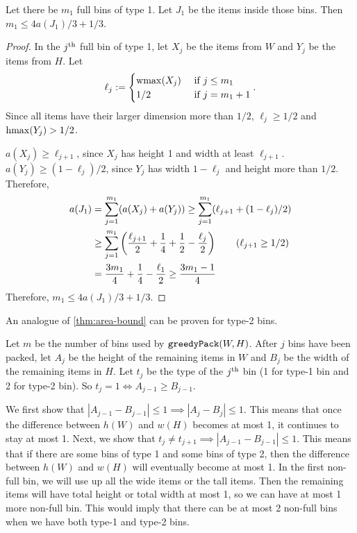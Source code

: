 \begin{lemma}
\label{thm:area-bound}
Let there be $m_1$ full bins of type 1.
Let $J_1$ be the items inside those bins.
Then $m_1 \le 4a(J_1)/3 + 1/3$.
\end{lemma}
\begin{proof}
In the $j^{\textrm{th}}$ full bin of type 1, let $X_j$ be the items from $W$
and $Y_j$ be the items from $H$. Let
\[ \ell_j := \begin{cases}\operatorname{wmax}(X_j) & \textrm{ if } j \le m_1
\\ 1/2 & \textrm{ if } j = m_1 + 1 \end{cases}. \]
Since all items have their larger dimension more than $1/2$,
$\ell_j \ge 1/2$ and $\operatorname{hmax}(Y_j) > 1/2$.

$a(X_j) \ge \ell_{j+1}$, since $X_j$ has height 1 and width at least $\ell_{j+1}$.
$a(Y_j) \ge (1-\ell_j)/2$, since $Y_j$ has width $1 - \ell_j$ and height more than $1/2$.
Therefore,
\begin{align*}
a(J_1) &= \sum_{j=1}^{m_1} (a(X_j) + a(Y_j))
\ge \sum_{j=1}^{m_1} (\ell_{j+1} + (1-\ell_j)/2)
\\ &\ge \sum_{j=1}^{m_1} \left(\frac{\ell_{j+1}}{2} + \frac{1}{4}
    + \frac{1}{2} - \frac{\ell_j}{2}\right)  \tag{$\ell_{j+1} \ge 1/2$}
\\ &= \frac{3m_1}{4} + \frac{1}{4} - \frac{\ell_1}{2}
\ge \frac{3m_1-1}{4}
\end{align*}
Therefore, $m_1 \le 4a(J_1)/3 + 1/3$.
\end{proof}

An analogue of \cref{thm:area-bound} can be proven for type-2 bins.

Let $m$ be the number of bins used by $\operatorname{\mathtt{greedyPack}}(W, H)$.
After $j$ bins have been packed, let $A_j$ be the height of the remaining items in $W$
and $B_j$ be the width of the remaining items in $H$.
Let $t_j$ be the type of the $j^{\textrm{th}}$ bin (1 for type-1 bin and 2 for type-2 bin).
So $t_j = 1 \iff A_{j-1} \ge B_{j-1}$.

We first show that $|A_{j-1} - B_{j-1}| \le 1 \implies |A_j - B_j| \le 1$.
This means that once the difference between $h(W)$ and $w(H)$ becomes at most 1,
it continues to stay at most 1.
Next, we show that $t_j \neq t_{j+1} \implies |A_{j-1} - B_{j-1}| \le 1$.
This means that if there are some bins of type 1 and some bins of type 2,
then the difference between $h(W)$ and $w(H)$ will eventually become at most 1.
In the first non-full bin, we will use up all the wide items or the tall items.
Then the remaining items will have total height or total width at most 1,
so we can have at most 1 more non-full bin.
This would imply that there can be at most 2 non-full bins
when we have both type-1 and type-2 bins.

